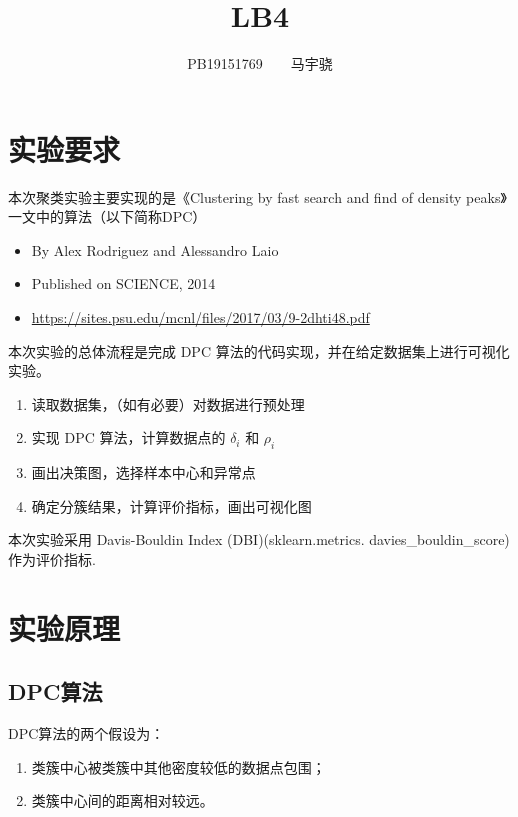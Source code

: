 \documentclass[UTF8,a4paper,AutoFakeBold,AutoFakeSlant]{article}
\title{\textbf{\textsf{{\textsf{LB4} \heiti{机器学习概论}}}}}
\author{\ssong PB19151769~~~~马宇骁}
\date{}
\begin{document}
\maketitle

\tableofcontents
\newpage




\section{实验要求}

本次聚类实验主要实现的是《Clustering by fast search and find of density peaks》一文中的算法（以下简称DPC）

\begin{itemize}
  \item By Alex Rodriguez and Alessandro Laio
  \item Published on SCIENCE, 2014
  \item \url{https://sites.psu.edu/mcnl/files/2017/03/9-2dhti48.pdf}
\end{itemize}

本次实验的总体流程是完成 DPC 算法的代码实现，并在给定数据集上进行可视化实验。
\begin{enumerate}
  \item 读取数据集，（如有必要）对数据进行预处理
  \item 实现 DPC 算法，计算数据点的 $\delta_i$ 和 $\rho_i$
  \item 画出决策图，选择样本中心和异常点
  \item 确定分簇结果，计算评价指标，画出可视化图
\end{enumerate}

本次实验采用 Davis-Bouldin Index (DBI)(sklearn.metrics. davies\_bouldin\_score) 作为评价指标.







\section{实验原理}


\subsection{DPC算法}

DPC算法的两个假设为：
\begin{enumerate}
  \item 类簇中心被类簇中其他密度较低的数据点包围；
  \item 类簇中心间的距离相对较远。
\end{enumerate}
\end{document}
